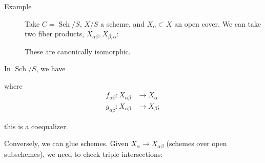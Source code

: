\begin{description}
\begin{center}
\end{center}
\item[Example]
Take \(C = {\operatorname{Sch}}/S\), \(X/S\) a scheme, and
\(X_\alpha \subset X\) an open cover. We can take two fiber products,
\(X_{\alpha \beta}, X_{\beta, \alpha}\):

\begin{center}
\end{center}

These are canonically isomorphic.
\end{description}

In \({\operatorname{Sch}}/S\), we have

\begin{center}
\end{center}

where
\begin{align*} f_{\alpha\beta}: X_{\alpha\beta} &\to X_\alpha \\ g_{\alpha\beta}: X_{\alpha\beta} &\to X_\beta ;\end{align*}

this is a coequalizer.

Conversely, we can glue schemes. Given \(X_\alpha \to X_{\alpha\beta}\)
(schemes over open subschemes), we need to check triple intersections:

